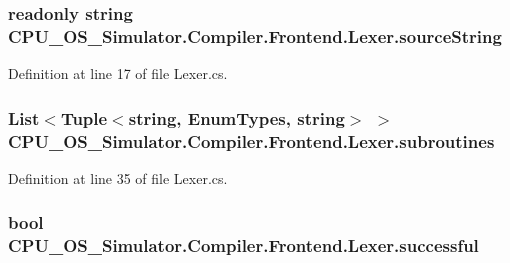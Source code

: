\subsubsection[{source\+String}]{\setlength{\rightskip}{0pt plus 5cm}readonly string C\+P\+U\+\_\+\+O\+S\+\_\+\+Simulator.\+Compiler.\+Frontend.\+Lexer.\+source\+String\hspace{0.3cm}{\ttfamily [private]}}\label{class_c_p_u___o_s___simulator_1_1_compiler_1_1_frontend_1_1_lexer_a735068e1008912edac69416bac78cef1}


Definition at line 17 of file Lexer.\+cs.

\hypertarget{class_c_p_u___o_s___simulator_1_1_compiler_1_1_frontend_1_1_lexer_a45c844ee9a1f5dedb94dcb4f19883d5a}{}
\subsubsection[{subroutines}]{\setlength{\rightskip}{0pt plus 5cm}List$<$Tuple$<$string, {\bf Enum\+Types}, string$>$ $>$ C\+P\+U\+\_\+\+O\+S\+\_\+\+Simulator.\+Compiler.\+Frontend.\+Lexer.\+subroutines\hspace{0.3cm}{\ttfamily [private]}}\label{class_c_p_u___o_s___simulator_1_1_compiler_1_1_frontend_1_1_lexer_a45c844ee9a1f5dedb94dcb4f19883d5a}


Definition at line 35 of file Lexer.\+cs.

\hypertarget{class_c_p_u___o_s___simulator_1_1_compiler_1_1_frontend_1_1_lexer_ad2b45c1eaf05bca9d992ed22a0331bae}{}
\subsubsection[{successful}]{\setlength{\rightskip}{0pt plus 5cm}bool C\+P\+U\+\_\+\+O\+S\+\_\+\+Simulator.\+Compiler.\+Frontend.\+Lexer.\+successful\hspace{0.3cm}{\ttfamily [private]}}\label{class_c_p_u___o_s___simulator_1_1_compiler_1_1_frontend_1_1_lexer_ad2b45c1eaf05bca9d992ed22a0331bae}


